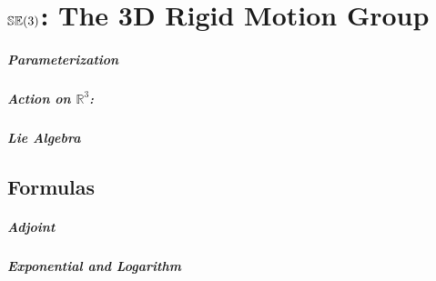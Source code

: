 \chapter{\texorpdfstring{${\mathbb{SE}(3)}$}{SE(3)}: The 3D Rigid Motion Group}

\paragraph{Parameterization}

\paragraph{Action on $\mathbb{R}^3$:}

\paragraph{Lie Algebra}

\section{Formulas}

\paragraph{Adjoint}

\paragraph{Exponential and Logarithm}

